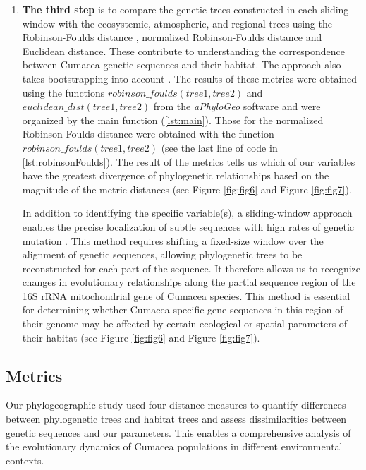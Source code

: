 {\begin{enumerate}
\item \textbf{The third step} is to compare the genetic trees constructed in each sliding window with the ecosystemic, atmospheric, and regional trees using the Robinson-Foulds distance \citep{robinson_comparison_1981}, normalized Robinson-Foulds distance and Euclidean distance. These contribute to understanding the correspondence between Cumacea genetic sequences and their habitat. The approach also takes bootstrapping into account \citep{koshkarov_phylogeography_2022}. The results of these metrics were obtained using the functions $robinson\_foulds(tree1, tree2)$ and $euclidean\_dist(tree1, tree2)$ from the \textit{aPhyloGeo} software and were organized by the main function (\autoref{lst:main}). Those for the normalized Robinson-Foulds distance were obtained with the function $robinson\_foulds(tree1, tree2)$ (see the last line of code in \autoref{lst:robinsonFoulds}). The result of the metrics tells us which of our variables have the greatest divergence of phylogenetic relationships based on the magnitude of the metric distances (see Figure \ref{fig:fig6} and Figure \ref{fig:fig7}).

In addition to identifying the specific variable(s), a sliding-window approach enables the precise localization of subtle sequences with high rates of genetic mutation \citep{koshkarov_phylogeography_2022}. This method requires shifting a fixed-size window over the alignment of genetic sequences, allowing phylogenetic trees to be reconstructed for each part of the sequence. It therefore allows us to recognize changes in evolutionary relationships along the partial sequence region of the 16S rRNA mitochondrial gene of Cumacea species. This method is essential for determining whether Cumacea-specific gene sequences in this region of their genome may be affected by certain ecological or spatial parameters of their habitat (see Figure \ref{fig:fig6} and Figure \ref{fig:fig7}).
\end{enumerate}

\subsection{Metrics}\label{metrics}
Our phylogeographic study used four distance measures to quantify differences between phylogenetic trees and habitat trees and assess dissimilarities between genetic sequences and our parameters. This enables a comprehensive analysis of the evolutionary dynamics of Cumacea populations in different environmental contexts.

}
